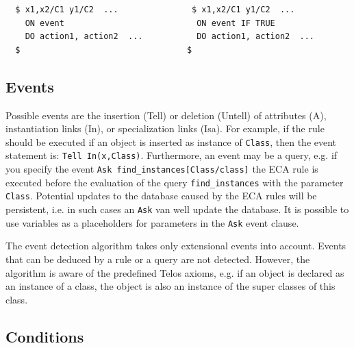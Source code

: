 {\small
\begin{verbatim}
  $ x1,x2/C1 y1/C2  ...               $ x1,x2/C1 y1/C2  ...
    ON event                           ON event IF TRUE
    DO action1, action2  ...           DO action1, action2  ...
  $                                  $
\end{verbatim}
}




\subsection{Events}

Possible events are the insertion (Tell) or deletion (Untell) of attributes (A),
instantiation links (In), or specialization links (Isa). For example,
if the rule should be executed if an object is inserted as instance
of {\tt Class}, then the event statement is: \verb+Tell In(x,Class)+.
Furthermore, an event may be a query, e.g. if you specify the event
\verb+Ask find_instances[Class/class]+ the ECA rule is executed
before the evaluation of the query \verb+find_instances+ with the parameter {\tt Class}.
Potential updates to the database caused by the ECA rules will be persistent, i.e.
in such cases an {\tt Ask} van well update the database.
It is possible to use variables as a placeholders for parameters in the {\tt Ask}
event clause.

The event detection algorithm takes only extensional events into account.
Events that can be deduced by a rule or a query are not detected.
However, the algorithm is aware of the predefined Telos axioms, e.g.
if an object is declared as an instance of a class, the object is also an instance
of the super classes of this class.

\subsection{Conditions}

